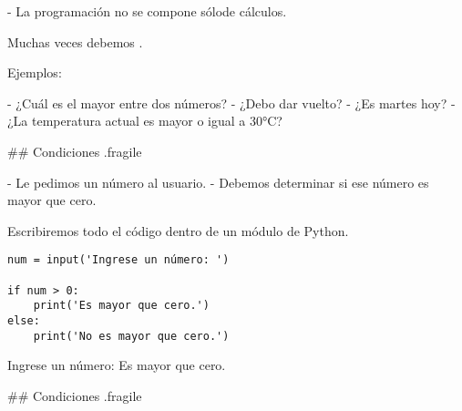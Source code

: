 - La programación no se compone sólo\newline de cálculos.


\vspace{-.6ex}

\pause

\bgnblockidea
Muchas veces debemos .
\trmblockidea

\vspace{2ex}

Ejemplos:

- ¿Cuál es el mayor entre dos números?
- ¿Debo dar vuelto?
- ¿Es martes hoy?
- ¿La temperatura actual es mayor o igual a 30°C?

## Condiciones {.fragile}


- Le pedimos un número al usuario.
- Debemos determinar si ese número es mayor que cero.

\bgnblocknormal[wd=.8\textwidth,centered]
Escribiremos todo el código dentro de un módulo de Python.
\trmblocknormal


\pause

\bgncolumns
{}
\vspace{-1ex}

\begin{lstlisting}
num = input('Ingrese un número: ')

if num > 0:
    print('Es mayor que cero.')
else:
    print('No es mayor que cero.')
\end{lstlisting}

\vspace{-1ex}

\begin{exampleConsole}
Ingrese un número: 
Es mayor que cero.
\end{exampleConsole}

\trmcolumns


## Condiciones {.fragile}

\vspace{-3ex}

